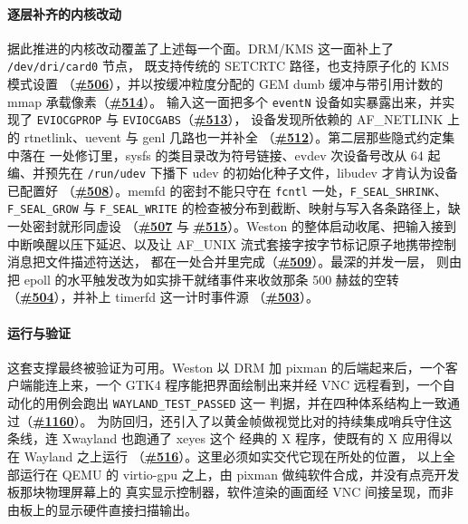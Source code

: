 \paragraph{逐层补齐的内核改动}
据此推进的内核改动覆盖了上述每一个面。DRM/KMS 这一面补上了 \texttt{/dev/dri/card0} 节点，
既支持传统的 SETCRTC 路径，也支持原子化的 KMS 模式设置
（\textbf{\href{https://github.com/rcore-os/tgoskits/pull/506}{\#506}}），并以按缓冲粒度分配的 GEM dumb
缓冲与带引用计数的 mmap 承载像素（\textbf{\href{https://github.com/rcore-os/tgoskits/pull/514}{\#514}}）。
输入这一面把多个 \texttt{eventN} 设备如实暴露出来，并实现了
\texttt{EVIOCGPROP} 与 \texttt{EVIOCGABS}（\textbf{\href{https://github.com/rcore-os/tgoskits/pull/513}{\#513}}），
设备发现所依赖的 AF\_NETLINK 上的 rtnetlink、uevent 与 genl 几路也一并补全
（\textbf{\href{https://github.com/rcore-os/tgoskits/pull/512}{\#512}}）。第二层那些隐式约定集中落在
一处修订里，sysfs 的类目录改为符号链接、evdev 次设备号改从 64 起编、并预先在 \texttt{/run/udev}
下播下 udev 的初始化种子文件，libudev 才肯认为设备已配置好
（\textbf{\href{https://github.com/rcore-os/tgoskits/pull/508}{\#508}}）。memfd 的密封不能只守在
\texttt{fcntl} 一处，\texttt{F\_SEAL\_SHRINK}、\texttt{F\_SEAL\_GROW} 与 \texttt{F\_SEAL\_WRITE}
的检查被分布到截断、映射与写入各条路径上，缺一处密封就形同虚设
（\textbf{\href{https://github.com/rcore-os/tgoskits/pull/507}{\#507}} 与
\textbf{\href{https://github.com/rcore-os/tgoskits/pull/515}{\#515}}）。Weston 的整体启动收尾、把输入接到
中断唤醒以压下延迟、以及让 AF\_UNIX 流式套接字按字节标记原子地携带控制消息把文件描述符送达，
都在一处合并里完成（\textbf{\href{https://github.com/rcore-os/tgoskits/pull/509}{\#509}}）。最深的并发一层，
则由把 epoll 的水平触发改为如实排干就绪事件来收敛那条 500 赫兹的空转
（\textbf{\href{https://github.com/rcore-os/tgoskits/pull/504}{\#504}}），并补上 timerfd 这一计时事件源
（\textbf{\href{https://github.com/rcore-os/tgoskits/pull/503}{\#503}}）。

\paragraph{运行与验证}
这套支撑最终被验证为可用。Weston 以 DRM 加 pixman 的后端起来后，一个客户端能连上来，一个 GTK4
程序能把界面绘制出来并经 VNC 远程看到，一个自动化的用例会跑出 \texttt{WAYLAND\_TEST\_PASSED} 这一
判据，并在四种体系结构上一致通过（\textbf{\href{https://github.com/rcore-os/tgoskits/pull/1160}{\#1160}}）。
为防回归，还引入了以黄金帧做视觉比对的持续集成哨兵守住这条线，连 Xwayland 也跑通了 xeyes 这个
经典的 X 程序，使既有的 X 应用得以在 Wayland 之上运行
（\textbf{\href{https://github.com/rcore-os/tgoskits/pull/516}{\#516}}）。这里必须如实交代它现在所处的位置，
以上全部运行在 QEMU 的 virtio-gpu 之上，由 pixman 做纯软件合成，并没有点亮开发板那块物理屏幕上的
真实显示控制器，软件渲染的画面经 VNC 间接呈现，而非由板上的显示硬件直接扫描输出。

